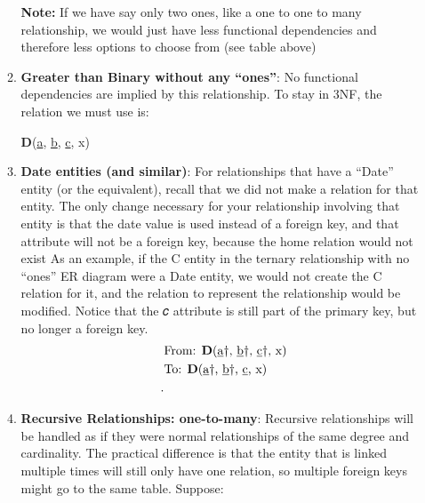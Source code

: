\documentclass{report}
\begin{document}
\begin{itemize}
\begin{enumerate}
\begin{table}[h!]
\begin{tabular}{ll}
                            \bottomrule
                        \end{tabular}
                    \end{table}
                    \textbf{Note:} If we have say only two ones, like a one to one to many relationship, we would just have less functional dependencies and therefore less options to choose from (see table above)
                \item \textbf{Greater than Binary without any “ones”}:
                    No functional dependencies are implied by this relationship. To stay in 3NF, the relation we must use is:
                    \begin{center}
                        \textbf{D}(\underline{a}\dag, \underline{b}\dag, \underline{c}\dag, x)
                    \end{center}
                \item \textbf{Date entities (and similar)}: For relationships that have a “Date” entity (or the equivalent), recall that we did not make a relation for that entity. The only change necessary for your relationship involving that entity is that the date value is used instead of a foreign key, and that attribute will not be a foreign key, because the home relation would not exist
                    \bigbreak \noindent 
                    As an example, if the C entity in the ternary relationship with no “ones” ER diagram were a Date entity, we would not create the C relation for it, and the relation to represent the relationship would be modified. Notice that the 𝑐 attribute is still part of the primary key, but no longer a foreign key.
                    \begin{align*}
                        &\text{From: \textbf{D}(\underline{a}\dag, \underline{b}\dag, \underline{c}\dag, x)} \\
                        &\text{To: \textbf{D}(\underline{a}\dag, \underline{b}\dag, \underline{c}, x)} \\
                   .\end{align*}
                \item \textbf{Recursive Relationships: one-to-many}: Recursive relationships will be handled as if they were normal relationships of the same degree and cardinality. The practical difference is that the entity that is linked multiple times will still only have one relation, so multiple foreign keys might go to the same table.
                    \bigbreak \noindent 
                    Suppose: 
                    \bigbreak \noindent 

\end{enumerate}
\end{itemize}
\end{document}
